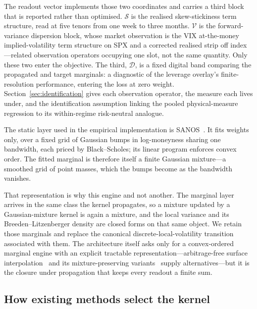 \documentclass[11pt]{article}
\providecommand{\1}{\mathbf 1}
\begin{document}
The readout vector implements those two coordinates and carries a third block that is reported
rather than optimised. $\mathcal S$ is the realised skew-stickiness term structure, read at five
tenors from one week to three months. $\mathcal V$ is the forward-variance dispersion block, whose
market observation is the VIX at-the-money implied-volatility term structure on SPX and a corrected
realised strip off index---related observation operators occupying one slot, not the same quantity.
Only these two enter the objective. The third, $\mathcal D$, is a fixed digital band comparing the
propagated and target marginals: a diagnostic of the leverage overlay's finite-resolution
performance, entering the loss at zero weight. Section~\ref{sec:identification} gives each
observation operator, the measure each lives under, and the identification assumption linking the
pooled physical-measure regression to its within-regime risk-neutral analogue.

The static layer used in the empirical implementation is
SANOS~\cite{buehler2026sanos}. It fits weights only, over a fixed grid of Gaussian bumps in
log-moneyness sharing one bandwidth, each priced by Black--Scholes; its linear program enforces
convex order. The fitted marginal is therefore itself a finite Gaussian mixture---a smoothed grid of
point masses, which the bumps become as the bandwidth vanishes.

That representation is why this engine and not another. The marginal layer arrives in the same class
the kernel propagates, so a mixture updated by a Gaussian-mixture kernel is again a mixture, and the
local variance and its Breeden--Litzenberger density are closed forms on that same object. We retain
those marginals and replace the canonical discrete-local-volatility transition associated with them.
The architecture itself asks only for a convex-ordered marginal engine with an explicit tractable
representation---arbitrage-free surface interpolation~\cite{andreasenhuge2011} and its
mixture-preserving variants~\cite{vandenbergmix2026} supply alternatives---but it is the closure
under propagation that keeps every readout a finite sum.


\subsection{How existing methods select the kernel}
\label{sec:landscape}
\end{document}
